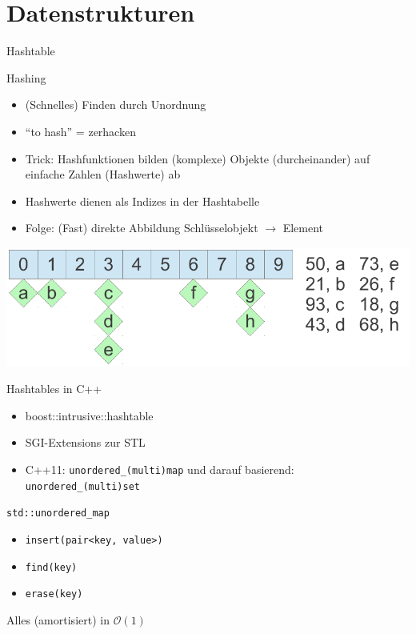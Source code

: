 \section{Datenstrukturen}

\begin{frame}{Hashtable}
 	\begin{block}{Hashing}
	 	\begin{itemize}
	 		\item (Schnelles) Finden durch Unordnung
	 		\item \enquote{to hash} = zerhacken
			\pause
	 		\item Trick: Hashfunktionen bilden (komplexe) Objekte (durcheinander) auf einfache Zahlen (Hashwerte) ab
	 		\item Hashwerte dienen als Indizes in der Hashtabelle
	 		\item Folge: (Fast) direkte Abbildung Schlüsselobjekt $\rightarrow$ Element
	 	\end{itemize}
 	\end{block}
 	
 	\pause
 	
 	\begin{center}
		\includegraphics[width=0.95\linewidth]{images/hashmap.pdf}
	\end{center}
\end{frame}

\begin{frame}{Hashtables in C++}
 	\begin{itemize}
 		\item boost::intrusive::hashtable
 		\item SGI-Extensions zur STL
 		\item C++11: \texttt{unordered\_(multi)map} und darauf basierend: \texttt{unordered\_(multi)set}
 	\end{itemize}
 	
 	\pause
 	
 	\begin{block}{\texttt{std::unordered\_map}}
	 	\begin{itemize}
	 		\item \texttt{insert(pair<key, value>)}
	 		\item \texttt{find(key)}
	 		\item \texttt{erase(key)}
	 	\end{itemize}
	 	\pause
	 	Alles (amortisiert) in $\mathcal{O}(1)$
 	\end{block}
\end{frame}

